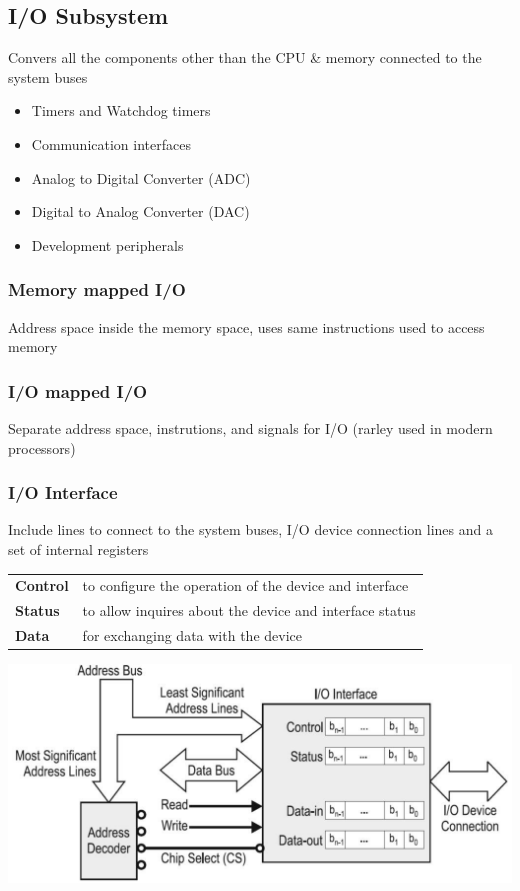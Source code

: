 \subsection{I/O Subsystem }
Convers all the components other than the \acs{CPU} \& memory connected to the system buses
\begin{itemize}
	\item Timers and Watchdog timers
	\item Communication interfaces
	\item Analog to Digital Converter (\acs{ADC})
	\item Digital to Analog Converter (\acs{DAC})
	\item Development peripherals
\end{itemize}
\begin{multicols}{2}
	\begin{minipage}{\linewidth}
		\subsubsection{Memory mapped \acs{I/O}}
		Address space inside the memory space, uses same instructions used to access memory
	\end{minipage}	
	\begin{minipage}{\linewidth}
		\subsubsection{\acs{I/O} mapped \acs{I/O}}
		Separate address space, instrutions, and signals for \acs{I/O} (rarley used in modern processors)
	\end{minipage}
\end{multicols}
\begin{minipage}{0.6\linewidth}
	\subsubsection{\acs{I/O} Interface}
	\raggedright
	Include lines to connect to the system buses, \acs{I/O} device connection lines and a set of internal registers
	\begin{tabular}{ll}
		\textbf{Control}  & to configure the operation of the device and interface  \\  
		\textbf{Status}   & to allow inquires about the device and interface status  \\ 
		\textbf{Data}     & for exchanging data with the device \\ 
	\end{tabular} 
\end{minipage}
\begin{minipage}{0.4\linewidth}
	\includegraphics[width=\linewidth]{images/IOAnatomy} 
\end{minipage}
\clearpage
\pagebreak
